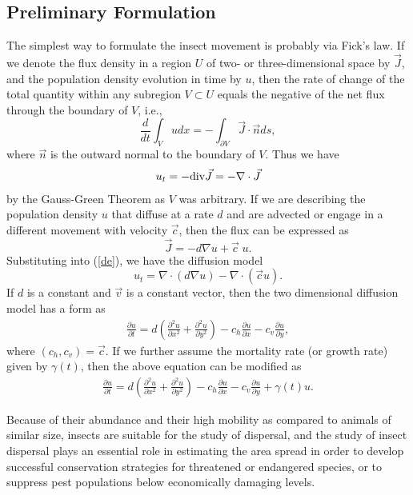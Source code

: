 \documentclass[11pt]{article}
\newcommand{\bean}{\begin{eqnarray*}}
\newcommand{\eean}{\end{eqnarray*}}
\newcommand{\bea}{\begin{eqnarray}}
\newcommand{\eea}{\end{eqnarray}}
\begin{document}
\subsection{Preliminary Formulation}   
The simplest way to formulate the insect movement is probably via Fick's law. If we denote the flux density in a region $U$ of two- or three-dimensional space by $\vec J$, and the population density evolution in time by $u$, then the rate of change of the total quantity within any subregion $V\subset U$ equals the negative of the net flux through the boundary of $V$, i.e.,
\[\frac{d}{dt}\int_V udx=-\int_{\partial V}\vec{J}\cdot \vec{n}ds,\]
where $\vec n$ is the outward normal to the boundary of $V$. Thus we have
\bea\label{de}
u_t=-\hbox{div}\vec{J}=-\nabla\cdot \vec{J}
\eea
by the Gauss-Green Theorem as $V$ was arbitrary. If we are describing the population density $u$ that diffuse at a rate $d$ and are advected or engage in a different movement with velocity $\vec c$, then the flux can be expressed as
\[ \vec{J}=-d\nabla u +\vec{c}\;u.\]
Substituting into (\ref{de}), we have the diffusion model 
\[u_t= \nabla\cdot\left( d\nabla u\right)-\nabla\cdot(\vec{c}u).\]
If $d$ is a constant and $\vec{v}$ is a constant vector, then the two dimensional diffusion model has a form as
\bean
\frac{\partial u}{\partial t}=d\left(\frac{\partial^2u}{\partial x^2}+\frac{\partial^2u}{\partial y^2}\right)-c_h\frac{\partial u}{\partial x}-c_v\frac{\partial u}{\partial y},
\eean
where $(c_h, c_v)=\vec{c}$. 
If we further assume the mortality rate (or growth rate) given by $\gamma(t)$, then the above equation can be modified as
\bea\label{model}
\frac{\partial u}{\partial t}=d\left(\frac{\partial^2u}{\partial x^2}+\frac{\partial^2u}{\partial y^2}\right)-c_h\frac{\partial u}{\partial x}-c_v\frac{\partial u}{\partial y}+\gamma(t) u.
\eea

Because of their abundance and their high mobility as compared to animals of similar size, insects are suitable for the study of dispersal, and the study of insect dispersal plays an essential role in estimating the area spread in order to develop successful conservation strategies for threatened or endangered species, or to suppress pest populations below economically damaging levels. 
\end{document}

